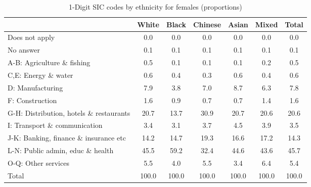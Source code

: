 \begin{table}[htbp]\centering
\def\sym#1{\ifmmode^{#1}\else\(^{#1}\)\fi}
\caption{1-Digit SIC codes by ethnicity for females (proportions)}
\begin{tabular}{l*{6}{c}}
\hline\hline
          &    White&    Black&  Chinese&    Asian&    Mixed&    Total\\
\hline
Does not apply&      0.0&      0.0&      0.0&      0.0&      0.0&      0.0\\
No answer &      0.1&      0.1&      0.1&      0.1&      0.1&      0.1\\
A-B: Agriculture \& fishing&      0.5&      0.1&      0.1&      0.1&      0.2&      0.5\\
C,E: Energy \& water&      0.6&      0.4&      0.3&      0.6&      0.4&      0.6\\
D: Manufacturing&      7.9&      3.8&      7.0&      8.7&      6.3&      7.8\\
F: Construction&      1.6&      0.9&      0.7&      0.7&      1.4&      1.6\\
G-H: Distribution, hotels \& restaurants&     20.7&     13.7&     30.9&     20.7&     20.6&     20.6\\
I: Transport \& communication&      3.4&      3.1&      3.7&      4.5&      3.9&      3.5\\
J-K: Banking, finance \& insurance etc&     14.2&     14.7&     19.3&     16.6&     17.2&     14.3\\
L-N: Public admin, educ \& health&     45.5&     59.2&     32.4&     44.6&     43.6&     45.7\\
O-Q: Other services&      5.5&      4.0&      5.5&      3.4&      6.4&      5.4\\
Total     &    100.0&    100.0&    100.0&    100.0&    100.0&    100.0\\
\hline\hline
\end{tabular}
\label{tab:1D_industries_female}
\end{table}
